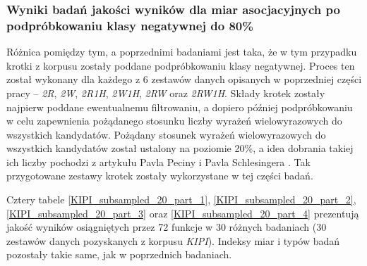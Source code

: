\subsubsection{Wyniki badań jakości wyników dla miar asocjacyjnych po podpróbkowaniu klasy negatywnej do 80\%}
Różnica pomiędzy tym, a poprzednimi badaniami jest taka, że w tym przypadku krotki z korpusu zostały poddane podpróbkowaniu klasy negatywnej.
Proces ten został wykonany dla każdego z 6 zestawów danych opisanych w poprzedniej części pracy -- \emph{2R}, \emph{2W}, \emph{2R1H}, \emph{2W1H}, \emph{2RW} oraz \emph{2RW1H}.
Składy krotek zostały najpierw poddane ewentualnemu filtrowaniu, a dopiero później podpróbkowaniu w celu zapewnienia pożądanego stosunku liczby wyrażeń wielowyrazowych do wszystkich kandydatów.
Pożądany stosunek wyrażeń wielowyrazowych do wszystkich kandydatów został ustalony na poziomie 20\%, a idea dobrania takiej ich liczby pochodzi z artykułu Pavla Peciny i Pavla Schlesingera \cite{coling}.
Tak przygotowane zestawy krotek zostały wykorzystane w tej części badań.

\par
Cztery tabele \ref{KIPI_subsampled_20_part_1}, \ref{KIPI_subsampled_20_part_2}, \ref{KIPI_subsampled_20_part_3} oraz \ref{KIPI_subsampled_20_part_4} prezentują jakość wyników osiągniętych przez 72 funkcje w 30 różnych badaniach (30 zestawów danych pozyskanych z korpusu \emph{KIPI}).
Indeksy miar i typów badań pozostały takie same, jak w poprzednich badaniach.


